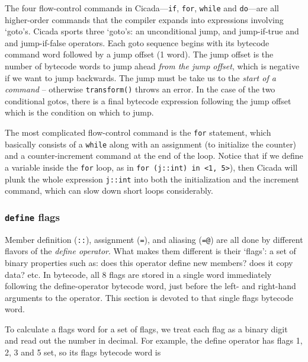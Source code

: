 \documentclass{article}
\begin{document}
The four flow-control commands in Cicada---\verb#if#, \verb#for#, \verb#while# and \verb#do#---are all higher-order commands that the compiler expands into expressions involving `goto's.  Cicada sports three `goto's:  an unconditional jump, and jump-if-true and and jump-if-false operators.  Each goto sequence begins with its bytecode command word followed by a jump offset (1 word).  The jump offset is the number of bytecode words to jump ahead \emph{from the jump offset}, which is negative if we want to jump backwards.  The jump must be take us to the \emph{start of a command} -- otherwise \verb#transform()# throws an error.  In the case of the two conditional gotos, there is a final bytecode expression following the jump offset which is the condition on which to jump.

The most complicated flow-control command is the \verb#for# statement, which basically consists of a \verb#while# along with an assignment (to initialize the counter) and a counter-increment command at the end of the loop.  Notice that if we define a variable inside the \verb#for# loop, as in \verb#for (j::int) in <1, 5>#), then Cicada will plunk the whole expression \verb#j::int# into both the initialization and the increment command, which can slow down short loops considerably.





\subsubsection{\texttt{define} flags} 

Member definition (\verb#::#), assignment (\verb#=#), and aliasing (\verb#=@#) are all done by different flavors of the \emph{define operator}.  What makes them different is their `flags':  a set of binary properties such as:  does this operator define new members? does it copy data? etc.  In bytecode, all 8 flags are stored in a single word immediately following the define-operator bytecode word, just before the left- and right-hand arguments to the operator.  This section is devoted to that single flags bytecode word.

To calculate a flags word for a set of flags, we treat each flag as a binary digit and read out the number in decimal.  For example, the define operator has flags 1, 2, 3 and 5 set, so its flags bytecode word is
\end{document}
